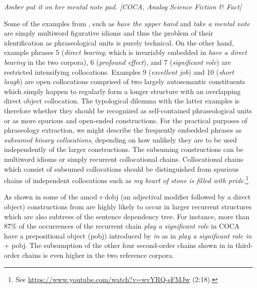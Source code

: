 \documentclass[output=paper]{langscibook}
\begin{document}
\ea
\textit{Amber put it on her mental note pad. [COCA, Analog Science Fiction \& Fact]} \label{ex:pezik:5}
\z

Some of the examples from , such as \textit{have the upper hand} and \textit{take a mental note} are simply multiword figurative idioms and thus the problem of their identification as phraseological units is purely technical. On the other hand, example phrases 5 (\textit{direct bearing}, which is invariably embedded in \textit{have a direct bearing} in the two corpora), 6 (\textit{profound effect}), and 7 (\textit{significant role}) are restricted intensifying collocations. Examples 9 (\textit{excellent job}) and 10 (\textit{short laugh}) are open collocations comprised of two largely autosemantic constituents which simply happen to regularly form a longer structure with an overlapping direct object collocation. The typological dilemma with the latter examples is therefore whether they should be recognized as self-contained phraseological units or as more spurious and open-ended constructions. For the practical purposes of phraseology extraction, we might describe the frequently embedded phrases as \textit{subsumed binary collocations}, depending on how unlikely they are to be used independently of the larger constructions. The subsuming constructions can be multiword idioms or simply recurrent collocational chains. Collocational chains which consist of subsumed collocations should be distinguished from spurious chains of independent collocations such as \textit{my heart of stone is filled with pride}.\footnote{See \url{https://www.youtube.com/watch?v=wvYRQ-sFMJw} (2:18).}

As shown in  some of the amod\,+\,dobj (an adjectival modifier followed by a direct object) constructions from  are highly likely to occur in larger recurrent structures which are also subtrees of the sentence dependency tree. For instance, more than 87\% of the occurrences of the recurrent chain \textit{play a significant role} in COCA have a prepositional object (pobj) introduced by \textit{in} as in \textit{play a significant role in} + pobj. The subsumption of the other four second-order chains shown in  in third-order chains is even higher in the two reference corpora.
\end{document}
